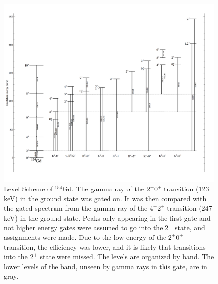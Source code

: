\begin{figure}[!]
    \centering
    \includegraphics[scale=0.18]{154GdTablesAndFigs/154Gd_2to0.png}
    \caption{Level Scheme of $^{154}$Gd. The gamma ray of the $2^+$\rightarrow$0^+$ transition (123 keV) in the ground state was gated on. It was then compared with the gated spectrum from the gamma ray of the $4^+$\rightarrow$2^+$ transition (247 keV) in the ground state. Peaks only appearing in the first gate and not higher energy gates were assumed to go into the $2^+$ state, and assignments were made. Due to the low energy of the $2^+$\rightarrow$0^+$ transition, the efficiency was lower, and it is likely that transitions into the $2^+$ state were missed. The levels are organized by band. The lower levels of the band, unseen by gamma rays in this gate, are in gray.}
    \label{fig:154_2to0}
\end{figure}